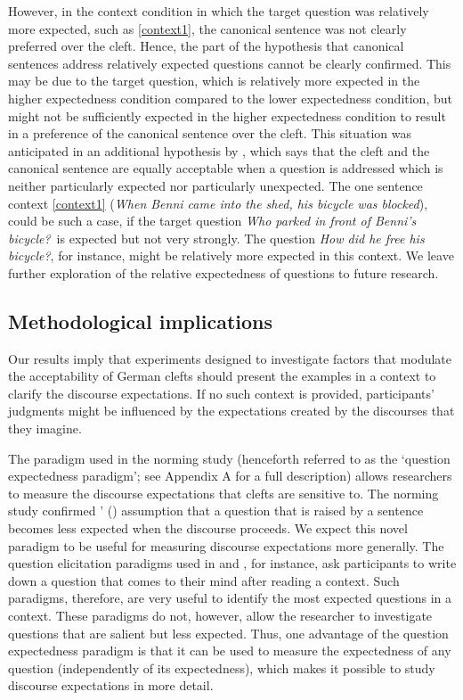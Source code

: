 \documentclass{salt}
\begin{document}
However, in the context condition in which the target question was relatively more expected, such as \ref{context1}, the canonical sentence was not clearly preferred over the cleft. Hence, the part of the hypothesis that canonical sentences address relatively expected questions cannot be clearly confirmed.
 This may be due to the target question, which is relatively more expected in the higher expectedness condition compared to the lower expectedness condition, but might not be sufficiently expected in the higher expectedness condition to result in a preference of the canonical sentence over the cleft. This situation was anticipated in an additional hypothesis by \citet[256--261]{tonnis_2021}, which says that the cleft and the canonical sentence are equally acceptable when a question is addressed which is neither particularly expected nor particularly unexpected. The one sentence context \ref{context1} ({\em When Benni came into the shed, his bicycle was blocked}), could be such a case, if the target question \textit{Who parked in front of Benni's bicycle?}~is expected but not very strongly. The question \textit{How did he free his bicycle?}, for instance, might be relatively more expected in this context. We leave further exploration of the relative expectedness of questions to future research.

\subsection{Methodological implications}
\label{subsec:method_impl}

Our results imply that experiments designed to investigate factors that modulate the acceptability of German clefts should present the examples in a context to clarify the discourse expectations. If no such context is provided, participants' judgments might be influenced by the expectations created by the discourses that they imagine. 

The paradigm used in the norming study (henceforth referred to as the `question expectedness paradigm'; see Appendix A for a full description) allows researchers to measure the discourse expectations that clefts are sensitive to. The norming study confirmed \citeauthor{tonnis_2021}' (\citeyear[273ff.]{tonnis_2021}) assumption that a question that is raised by a sentence becomes less expected when the discourse proceeds. We expect this novel paradigm to be useful for measuring discourse expectations more generally. The question elicitation paradigms used in \cite{kehler_rohde_2017} and \cite{westera_rohde_2019}, for instance, ask participants to write down a question that comes to their mind after reading a context. Such paradigms, therefore, are very useful to identify the most expected questions in a context. These paradigms do not, however, allow the researcher to investigate questions that are salient but less expected. Thus, one advantage of the question expectedness paradigm is that it can be used to measure the expectedness of any question (independently of its expectedness), which makes it possible to study discourse expectations in more detail.  
\end{document}
